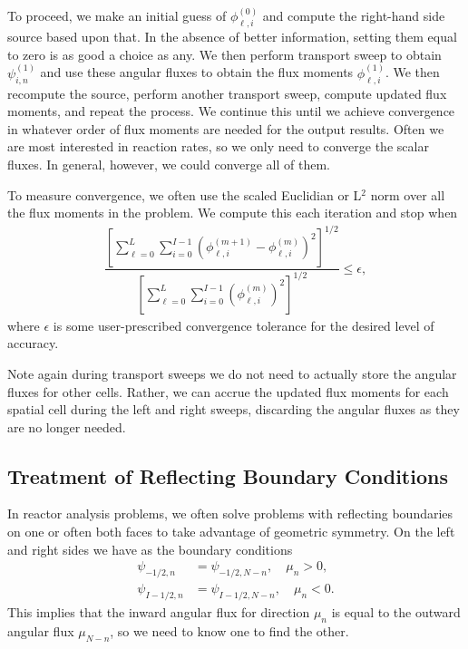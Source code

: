 To proceed, we make an initial guess of $\phi_{\ell,i}^{(0)}$ and compute the right-hand side source based upon that. In the absence of better information, setting them equal to zero is as good a choice as any. We then perform transport sweep to obtain $\psi_{i,n}^{(1)}$ and use these angular fluxes to obtain the flux moments $\phi_{\ell,i}^{(1)}$. We then recompute the source, perform another transport sweep, compute updated flux moments, and repeat the process. We continue this until we achieve convergence in whatever order of flux moments are needed for the output results. Often we are most interested in reaction rates, so we only need to converge the scalar fluxes. In general, however, we could converge all of them.

To measure convergence, we often use the scaled Euclidian or L$^2$ norm over all the flux moments in the problem. We compute this each iteration and stop when
\begin{align}
  \dfrac{ \left[ \displaystyle\sum_{\ell=0}^L \sum_{i=0}^{I-1} \left( \phi_{\ell,i}^{(m+1)} - \phi_{\ell,i}^{(m)} \right)^2 \right]^{1/2} }{ \left[ \displaystyle\sum_{\ell=0}^L \sum_{i=0}^{I-1} \left( \phi_{\ell,i}^{(m)} \right)^2 \right]^{1/2} } \le \epsilon,
\end{align}
where $\epsilon$ is some user-prescribed convergence tolerance for the desired level of accuracy.

Note again during transport sweeps we do not need to actually store the angular fluxes for other cells. Rather, we can accrue the updated flux moments for each spatial cell during the left and right sweeps, discarding the angular fluxes as they are no longer needed.





\subsection{Treatment of Reflecting Boundary Conditions}

In reactor analysis problems, we often solve problems with reflecting boundaries on one or often both faces to take advantage of geometric symmetry. On the left and right sides we have as the boundary conditions
\begin{subequations}
\begin{align}
  \psi_{-1/2,n}  &= \psi_{-1/2,N-n}, \quad \mu_n > 0, \\
  \psi_{I-1/2,n} &= \psi_{I-1/2,N-n}, \quad \mu_n < 0.
\end{align}
\end{subequations}
This implies that the inward angular flux for direction $\mu_n$ is equal to the outward angular flux $\mu_{N-n}$, so we need to know one to find the other.

